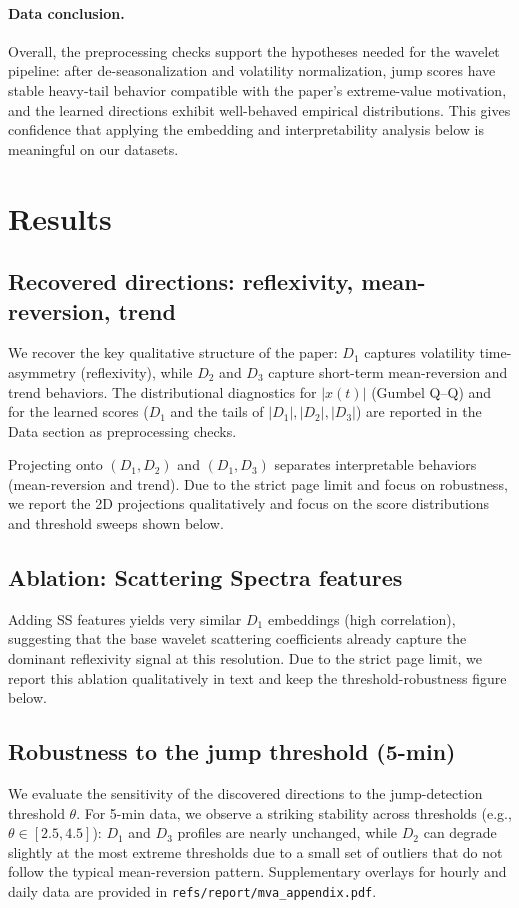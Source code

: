 \documentclass[10pt]{article}
\begin{document}
\paragraph{Data conclusion.}
Overall, the preprocessing checks support the hypotheses needed for the wavelet pipeline: after de-seasonalization and volatility normalization, jump scores have stable heavy-tail behavior compatible with the paper's extreme-value motivation, and the learned directions exhibit well-behaved empirical distributions. This gives confidence that applying the embedding and interpretability analysis below is meaningful on our datasets.

\section{Results}

\subsection{Recovered directions: reflexivity, mean-reversion, trend}
We recover the key qualitative structure of the paper: $D_1$ captures volatility time-asymmetry (reflexivity), while $D_2$ and $D_3$ capture short-term mean-reversion and trend behaviors. The distributional diagnostics for $|x(t)|$ (Gumbel Q--Q) and for the learned scores ($D_1$ and the tails of $|D_1|,|D_2|,|D_3|$) are reported in the Data section as preprocessing checks.

Projecting onto $(D_1,D_2)$ and $(D_1,D_3)$ separates interpretable behaviors (mean-reversion and trend). Due to the strict page limit and focus on robustness, we report the 2D projections qualitatively and focus on the score distributions and threshold sweeps shown below.

\subsection{Ablation: Scattering Spectra features}
Adding SS features yields very similar $D_1$ embeddings (high correlation), suggesting that the base wavelet scattering coefficients already capture the dominant reflexivity signal at this resolution. Due to the strict page limit, we report this ablation qualitatively in text and keep the threshold-robustness figure below.

\subsection{Robustness to the jump threshold (5-min)}
We evaluate the sensitivity of the discovered directions to the jump-detection threshold $\theta$. For 5-min data, we observe a striking stability across thresholds (e.g., $\theta\in[2.5,4.5]$): $D_1$ and $D_3$ profiles are nearly unchanged, while $D_2$ can degrade slightly at the most extreme thresholds due to a small set of outliers that do not follow the typical mean-reversion pattern.
Supplementary overlays for hourly and daily data are provided in \texttt{refs/report/mva\_appendix.pdf}.
\end{document}
